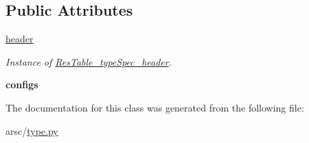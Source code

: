 \subsection*{Public Attributes}
\begin{DoxyCompactItemize}
\item 
\mbox{\label{classtype_1_1ResTable__type_ae0ced730ac21545acd3efe0c40eb1203}} 
\mbox{\hyperlink{classtype_1_1ResTable__type_ae0ced730ac21545acd3efe0c40eb1203}{header}}
\begin{DoxyCompactList}\small\item\em Instance of \mbox{\hyperlink{classtype_1_1ResTable__typeSpec__header}{Res\+Table\+\_\+type\+Spec\+\_\+header}}. \end{DoxyCompactList}\item 
\mbox{\label{classtype_1_1ResTable__type_a437518444e1ac869b723db87f3a13842}} 
{\bfseries configs}
\end{DoxyCompactItemize}


The documentation for this class was generated from the following file\+:\begin{DoxyCompactItemize}
\item 
arsc/\mbox{\hyperlink{type_8py}{type.\+py}}\end{DoxyCompactItemize}
